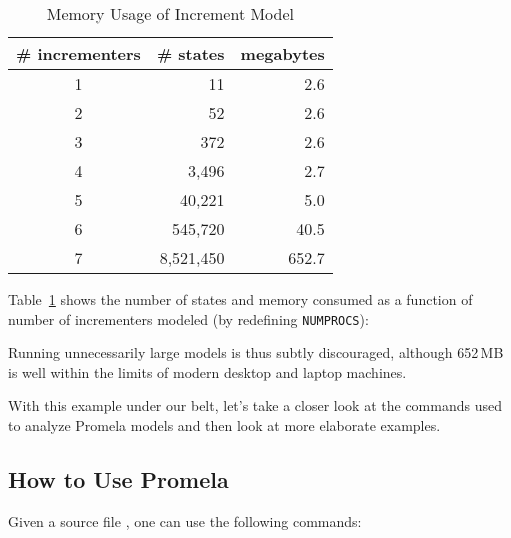 \begin{table}
\footnotesize
\centering
\begin{tabular}{c|r|r}
	\# incrementers & \# states &	megabytes \\
	\hline
	\hline
	1 &		        11 &          2.6 \\
	\hline
	2 &		        52 &          2.6 \\
	\hline
	3 &		       372 &          2.6 \\
	\hline
	4 &		     3,496 &          2.7 \\
	\hline
	5 &		    40,221 &          5.0 \\
	\hline
	6 &		   545,720 &         40.5 \\
	\hline
	7 &		 8,521,450 &        652.7 \\
\end{tabular}
\caption{Memory Usage of Increment Model}
\label{tab:advsync:Memory Usage of Increment Model}
\end{table}

Table~\ref{tab:advsync:Memory Usage of Increment Model}
shows the number of states and memory consumed
as a function of number of incrementers modeled
(by redefining {\tt NUMPROCS}):

Running unnecessarily large models is thus subtly discouraged, although
652\,MB is well within the limits of modern desktop and laptop machines.

With this example under our belt, let's take a closer look at the
commands used to analyze Promela models and then look at more
elaborate examples.

\subsection{How to Use Promela}
\label{sec:formal:How to Use Promela}

Given a source file , one can use the following commands:

